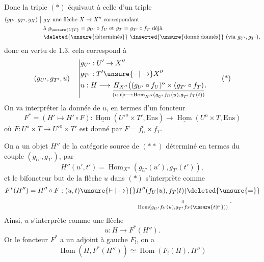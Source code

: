 Donc la  triple $(*)$ équivaut à celle d'un
triple
\[
\begin{aligned}
(g_{U'},g_{T'},g_X)\ \big|\ &g_X\text{ une flèche }X\to X''\text{ correspondant}\\
&\text{à }g_{\unsure{U|T}}=g_{U'}\circ f_U\text{ et }g_T=g_{T'}\circ f_T\text{ déjà}\\
&\deleted{\text{\unsure{déterminés}}}\ \text{\inserted{\unsure{donné|donnés}} (via }g_{U'},g_{T'}\text{),}
\end{aligned}
\]
donc en vertu de 1.3. cela correspond à
\[
\begin{aligned}
(g_{U'},g_{T'},u)\quad\left|\begin{aligned}
&g_{U'}:U'\to X''\\
&g_{T'}:T'\unsure{-|\to}X''\\
&u:H\longrightarrow
\underset{\scriptstyle (u,t)\longmapsto\operatorname{Hom}_{X''}(g_{U'}f_U(u),g_{T'}f_T(t))}
{\underline{H_{X''}\bigl((g_{U'}\circ f_U)^{\mathrm o}\times(g_{T'}\circ f_T)}} .
\end{aligned}\right.
\end{aligned}\tag*{(*)}
\]
On va interpréter la donnée de $u$, en termes d'un
foncteur
\[
F^*=(H'\mapsto H'\circ F):
\underline{\operatorname{Hom}}({U'}^{\mathrm o}\times T',\mathrm{Ens})\to
\underline{\operatorname{Hom}}(U^{\mathrm o}\times T,\mathrm{Ens})\tag*{(**)}
\]
où $F:U^{\mathrm o}\times T\longrightarrow {U'}^{\mathrm o}\times T'$ est donné par $F=f_U^{\mathrm o}\times f_T$.

On a un objet $H''$  de la catégorie source de $(**)$
déterminé  en termes du couple $(g_{U'},g_{T'})$, par
\[
H''(u',t')=\operatorname{Hom}_{X''}(g_{U'}(u'),g_{T'}(t')),
\]
et le bifoncteur but de la flèche $u$ dans $(*)$ s'interprète comme
\[
\begin{aligned}
F^*(H'')=H''\circ F:(u,t)\unsure{\vdash|\mapsto}{}&
 H''(f_U(u),f_T(t))\deleted{\unsure{=}}\\
&\underset{\operatorname{Hom}(g_{U'}f_U(u),g_{T'}f_T(\unsure{t|t'}))}{\shortparallel}.
\end{aligned}
\]
Ainsi, $u$ s'interprète comme une flèche
\[
u:H\longrightarrow F^*(H'').
\]
Or le foncteur $F^*$ a un adjoint à gauche
$F_!$,  on a
\[
\operatorname{Hom}(H,F^*(H''))\simeq\operatorname{Hom}(F_!(H),H'')\tag*{(***)}
\]
